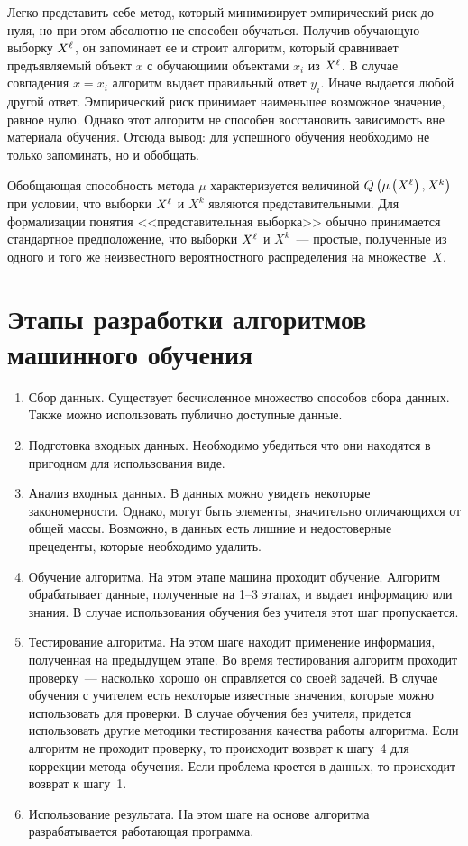 Легко представить себе метод, который минимизирует эмпирический риск до нуля, но при этом абсолютно не
способен обучаться. Получив обучающую выборку \( X^\ell \), он запоминает ее и строит алгоритм, который
сравнивает предъявляемый объект \( x \) с обучающими объектами \( x_i \) из \( X^\ell \). В случае
совпадения \( x = x_i \) алгоритм выдает правильный ответ \( y_i \). Иначе выдается любой другой ответ.
Эмпирический риск принимает наименьшее возможное значение, равное нулю. Однако этот алгоритм не
способен восстановить зависимость вне материала обучения. Отсюда вывод: для успешного обучения
необходимо не только запоминать, но и обобщать.

Обобщающая способность метода \( \mu \) характеризуется величиной\linebreak
\( Q\left(\mu\left(X^\ell\right), X^k\right) \) при условии, что выборки \( X^\ell \) и \( X^k \) являются
представительными. Для формализации понятия <<представительная выборка>> обычно принимается стандартное
предположение, что выборки \( X^\ell \) и \( X^k \)~--- простые, полученные из одного и того же
неизвестного вероятностного распределения на множестве~\( X \).

\section{Этапы разработки алгоритмов машинного обучения}
\begin{enumerate}
  \itemsep-5pt
  \item Сбор данных. Существует бесчисленное множество способов сбора данных. Также можно использовать
    публично доступные данные.
  \item Подготовка входных данных. Необходимо убедиться что они находятся в пригодном для использования
    виде.
  \item Анализ входных данных. В данных можно увидеть некоторые закономерности. Однако, могут быть
    элементы, значительно отличающихся от общей массы. Возможно, в данных есть лишние и недостоверные
    прецеденты, которые необходимо удалить.
  \item Обучение алгоритма. На этом этапе машина проходит обучение. Алгоритм обрабатывает данные,
    полученные на 1--3 этапах, и выдает информацию или знания. В случае использования обучения без
    учителя этот шаг пропускается.
  \item Тестирование алгоритма. На этом шаге находит применение информация, полученная на предыдущем
    этапе. Во время тестирования алгоритм проходит проверку~--- насколько хорошо он справляется со
    своей задачей. В случае обучения с учителем есть некоторые известные значения, которые можно
    использовать для проверки. В случае обучения без учителя, придется использовать другие методики
    тестирования качества работы алгоритма. Если алгоритм не проходит проверку, то происходит возврат к
    шагу~4 для коррекции метода обучения. Если проблема кроется в данных, то происходит возврат к
    шагу~1.
  \item Использование результата. На этом шаге на основе алгоритма разрабатывается работающая
    программа.
\end{enumerate}

